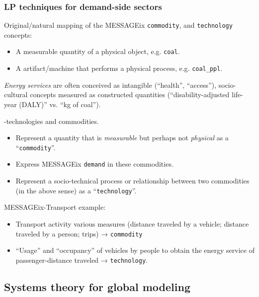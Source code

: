 \documentclass[12pt,aspectratio=169]{beamer}
\begin{document}
\begin{frame}[allowframebreaks]
  \frametitle{LP techniques for demand-side sectors}

  \bigskip
  Original/natural mapping of the MESSAGEix \texttt{commodity}, and \texttt{technology} concepts:
  \begin{itemize}
    \item A measurable quantity of a physical object, e.g. \texttt{coal}.
    \item A artifact/machine that performs a physical process, e.g. \texttt{coal\_ppl}.
  \end{itemize}

  \bigskip
  \emph{Energy services} are often conceived as intangible (“health”, “access”), socio-cultural concepts measured as constructed quantities (“disability-adjusted life-year (DALY)” vs. “kg of coal”).

  \framebreak
  -technologies and commodities.
  \begin{itemize}
    \item Represent a quantity that is \emph{measurable} but perhaps not \emph{physical} as a “\texttt{commodity}”.
    \item Express MESSAGEix \texttt{demand} in these commodities.
    \item Represent a socio-technical process or relationship between two commodities (in the above sense) as a “\texttt{technology}”.
  \end{itemize}

  \bigskip
  MESSAGEix-Transport example:
  \begin{itemize}
    \item Transport activity various measures (distance traveled by a vehicle; distance traveled by a person; trips) → \texttt{commodity}
    \item “Usage” and “occupancy” of vehicles by people to obtain the energy service of passenger-distance traveled → \texttt{technology}.
  \end{itemize}

\end{frame}

\subsection{Systems theory for global modeling}
\end{document}
